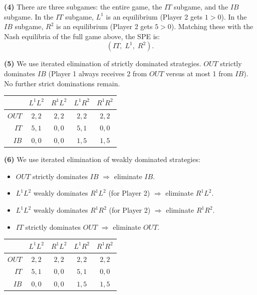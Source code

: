 \documentclass[11pt,english]{article}
\begin{document}
\begin{enumerate}
\begin{solution}
\textbf{(4)} There are three subgames: the entire game, the $IT$ subgame, and
the $IB$ subgame. In the $IT$ subgame, $L^1$ is an equilibrium (Player 2 gets
$1 > 0$). In the $IB$ subgame, $R^2$ is an equilibrium (Player 2 gets $5 >
0$). Matching these with the Nash equilibria of the full game above, the SPE
is:
\[
    \boxed{(IT,\; L^1,\; R^2).}
\]
 
\textbf{(5)} We use iterated elimination of strictly dominated strategies.
$OUT$ strictly dominates $IB$ (Player 1 always receives 2 from $OUT$ versus
at most 1 from $IB$). No further strict dominations remain.
 
\begin{center}
\begin{tabular}{r|cccc}
\toprule
             & $L^1L^2$ & $R^1L^2$ & $L^1R^2$ & $R^1R^2$ \\
\midrule
$OUT$        & $2,2$    & $2,2$    & $2,2$    & $2,2$    \\
$IT$         & $5,1$    & $0,0$    & $5,1$    & $0,0$    \\
\sout{$IB$}  & \sout{$0,0$} & \sout{$0,0$} & \sout{$1,5$} & \sout{$1,5$} \\
\bottomrule
\end{tabular}
\end{center}
 
\textbf{(6)} We use iterated elimination of weakly dominated strategies:
 
\begin{itemize}
  \item $OUT$ strictly dominates $IB$ $\Rightarrow$ eliminate $IB$.
  \item $L^1L^2$ weakly dominates $R^1L^2$ (for Player 2) $\Rightarrow$
    eliminate $R^1L^2$.
  \item $L^1L^2$ weakly dominates $R^1R^2$ (for Player 2) $\Rightarrow$
    eliminate $R^1R^2$.
  \item $IT$ strictly dominates $OUT$ $\Rightarrow$ eliminate $OUT$.
\end{itemize}
 
\begin{center}
\begin{tabular}{r|cccc}
\toprule
             & $L^1L^2$ & \sout{$R^1L^2$}   & $L^1R^2$ & \sout{$R^1R^2$}   \\
\midrule
\sout{$OUT$} & \sout{$2,2$} & \sout{$2,2$} & \sout{$2,2$} & \sout{$2,2$} \\
$IT$         & $5,1$    & \sout{$0,0$}      & $5,1$    & \sout{$0,0$}      \\
\sout{$IB$}  & \sout{$0,0$} & \sout{$0,0$} & \sout{$1,5$} & \sout{$1,5$} \\
\bottomrule
\end{tabular}
\end{center}
 

\end{solution}
\end{enumerate}
\end{document}
